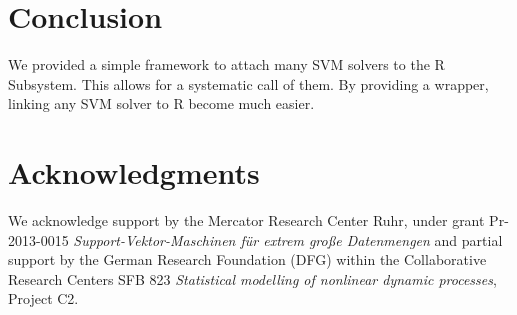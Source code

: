 \documentclass[article]{jss}
\begin{document}
\section{Conclusion}

We provided a simple framework to attach many SVM solvers to the R Subsystem.
This allows for a systematic call of them.
By providing a wrapper, linking any SVM solver to R become much easier.



\section*{Acknowledgments}

We acknowledge support by the Mercator Research Center Ruhr,
under grant Pr-2013-0015 \textit{Support-Vektor-Maschinen f{\"u}r extrem gro{\ss}e Datenmengen} and
partial support by the German Research Foundation (DFG) within the Collaborative Research Centers SFB 823
\textit{Statistical modelling of nonlinear dynamic processes}, Project C2.
\end{document}
